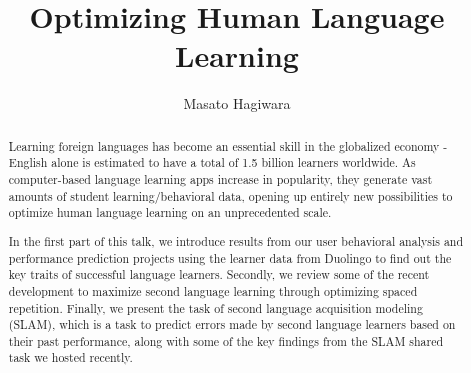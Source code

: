 \documentclass[runningheads]{llncs}
\begin{document}
%
\title{Optimizing Human Language Learning}
%
%
\author{Masato Hagiwara}
%
%
%
\maketitle              %
%
\begin{abstract}
Learning foreign languages has become an essential skill in the globalized economy - English alone is estimated to have a total of 1.5 billion learners worldwide. As computer-based language learning apps increase in popularity, they generate vast amounts of student learning/behavioral data, opening up entirely new possibilities to optimize human language learning on an unprecedented scale.

In the first part of this talk, we introduce results from our user behavioral analysis and performance prediction projects using the learner data from Duolingo to find out the key traits of successful language learners. Secondly, we review some of the recent development to maximize second language learning through optimizing spaced repetition. Finally, we present the task of second language acquisition modeling (SLAM), which is a task to predict errors made by second language learners based on their past performance, along with some of the key findings from the SLAM shared task we hosted recently.

\end{abstract}
%
%
%
\end{document}
